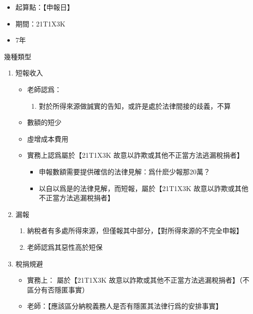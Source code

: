 \documentclass[]{ctexbook}
\providecommand{\tightlist}{%
  \setlength{\itemsep}{0pt}\setlength{\parskip}{0pt}}
\begin{document}
\begin{itemize}
  \begin{itemize}
  \tightlist
  \item
    起算點：【申報日】
  \item
    期間：21T1X3K
  \item
    7年
  \end{itemize}
\end{itemize}

幾種類型

\begin{enumerate}
\def\labelenumi{\arabic{enumi}.}
\tightlist
\item
  短報收入

  \begin{itemize}
  \tightlist
  \item
    老師認爲：

    \begin{enumerate}
    \def\labelenumii{\arabic{enumii}.}
    \tightlist
    \item
      對於所得來源做誠實的告知，或許是處於法律間接的歧義，不算
    \end{enumerate}
  \item
    數額的短少
  \item
    虛增成本費用
  \item
    實務上認爲屬於【21T1X3K 故意以詐欺或其他不正當方法逃漏稅捐者】

    \begin{itemize}
    \tightlist
    \item
      申報數額需要提供確信的法律見解：爲什麽少報那20萬？
    \item
      以自以爲是的法律見解，而短報，屬於【21T1X3K 故意以詐欺或其他不正當方法逃漏稅捐者】
    \end{itemize}
  \end{itemize}
\item
  漏報

  \begin{enumerate}
  \def\labelenumii{\arabic{enumii}.}
  \tightlist
  \item
    納稅者有多處所得來源，但僅報其中部分，【對所得來源的不完全申報】
  \item
    老師認爲其惡性高於短保
  \end{enumerate}
\item
  稅捐規避

  \begin{itemize}
  \tightlist
  \item
    實務上： 屬於【21T1X3K 故意以詐欺或其他不正當方法逃漏稅捐者】（不區分有否隱匿事實）
  \item
    老師：【應該區分納稅義務人是否有隱匿其法律行爲的安排事實】


\end{itemize}
\end{enumerate}
\end{document}
